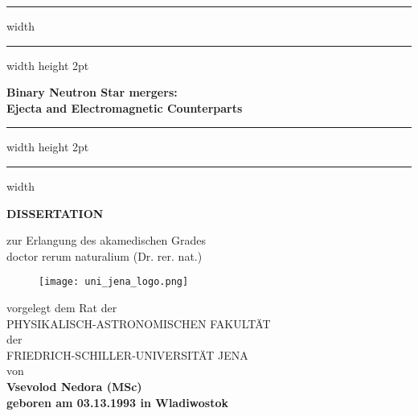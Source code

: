 \documentclass[
openright,
12pt, %
english,%
onehalfspacing, %
nolistspacing, %
nohyperref, %
headsepline, %
]{MastersDoctoralThesis} %
\begin{document}
\frontmatter %
\pagestyle{plain} %


\begin{titlepage}
    
    \begin{center}
        \centering
        {\hrule width \hsize \kern 1mm \hrule width \hsize height 2pt}
        \vspace{5mm}
        \Huge 
        \textbf{Binary Neutron Star mergers:\\ Ejecta and Electromagnetic Counterparts}
        \vspace{5mm}
        {\hrule width \hsize height 2pt \kern 1mm  \hrule width \hsize }
        
        \vspace{1.5cm}
        
        \LARGE 
        \textbf{DISSERTATION} 
        
        \vspace{0.70cm}
        
        \large
        zur Erlangung des akamedischen Grades\\
        doctor rerum naturalium (Dr. rer. nat.)
        \vspace{0.8cm}
        
        \begin{figure}[!ht]
            \centering
            \texttt{[image: uni\_jena\_logo.png]}
        \end{figure}
        
        \vspace{0.8cm}
        vorgelegt dem Rat der \\
        \vspace{0.3cm}
        PHYSIKALISCH-ASTRONOMISCHEN FAKULT{\"A}T \\
        \vspace{0.3cm}
        der \\
        \vspace{0.3cm}
        FRIEDRICH-SCHILLER-UNIVERSIT{\"A}T JENA \\
        \vspace{0.3cm}
        von \\
        \vspace{0.3cm}
        \bf{Vsevolod Nedora (MSc)} \\
        \vspace{0.3cm}
        geboren am 03.13.1993 in Wladiwostok
        
    \end{center}
    
\end{titlepage}
\end{document}
